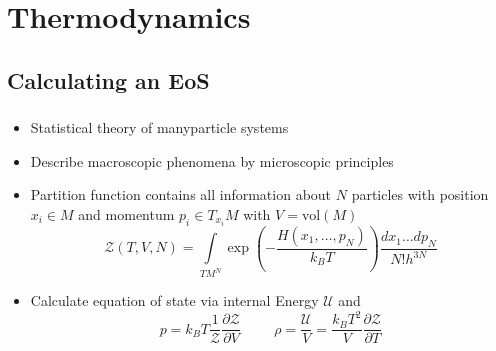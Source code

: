\section{Thermodynamics}

\subsection{Calculating an EoS}
\begin{frame}
	\frametitle{\insertsubsection}
	\begin{itemize}[<+->]
		\item Statistical theory of manyparticle systems
		\item Describe macroscopic phenomena by microscopic principles
		\item Partition function contains all information about $N$ particles with position $x_i\in M$ and momentum $p_i\in T_{x_i}M$ with $V=\text{vol}(M)$
		\begin{equation}
			\mathcal{Z}(T,V,N) = \int\limits_{TM^N}\exp\left(-\frac{H(x_1,\dots,p_N)}{k_BT}\right)\frac{dx_1\dots dp_N}{N!h^{3N}}
		\end{equation}
		\item Calculate equation of state via internal Energy $\mathcal{U}$ and
		\begin{equation}
			p = k_BT\frac{1}{\mathcal{Z}}\frac{\partial\mathcal{Z}}{\partial V} \hspace{1cm} \rho = \frac{\mathcal{U}}{V} = \frac{k_BT^2}{V}\frac{\partial\mathcal{Z}}{\partial T}
			\label{1-Thermo-Pres-Dens}
		\end{equation}
	\end{itemize}
\end{frame}

